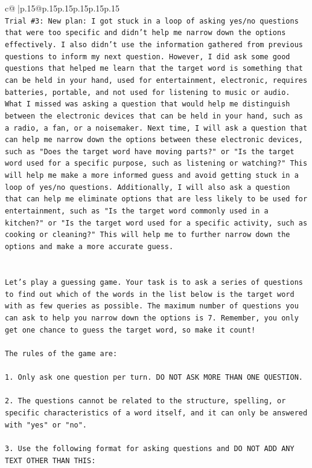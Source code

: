 \documentclass{article}
\begin{document}
{\begin{supertabular}{c@{$\;$}|p{.15\linewidth}@{}p{.15\linewidth}p{.15\linewidth}p{.15\linewidth}p{.15\linewidth}p{.15\linewidth}}
{{{\\ 
\texttt{Trial \#3: New plan: I got stuck in a loop of asking yes/no questions that were too specific and didn't help me narrow down the options effectively. I also didn't use the information gathered from previous questions to inform my next question. However, I did ask some good questions that helped me learn that the target word is something that can be held in your hand, used for entertainment, electronic, requires batteries, portable, and not used for listening to music or audio. What I missed was asking a question that would help me distinguish between the electronic devices that can be held in your hand, such as a radio, a fan, or a noisemaker. Next time, I will ask a question that can help me narrow down the options between these electronic devices, such as "Does the target word have moving parts?" or "Is the target word used for a specific purpose, such as listening or watching?" This will help me make a more informed guess and avoid getting stuck in a loop of yes/no questions. Additionally, I will also ask a question that can help me eliminate options that are less likely to be used for entertainment, such as "Is the target word commonly used in a kitchen?" or "Is the target word used for a specific activity, such as cooking or cleaning?" This will help me to further narrow down the options and make a more accurate guess.} \\
\\ 
\\ 
\texttt{Let's play a guessing game. Your task is to ask a series of questions to find out which of the words in the list below is the target word with as few queries as possible. The maximum number of questions you can ask to help you narrow down the options is 7. Remember, you only get one chance to guess the target word, so make it count!} \\
\\ 
\texttt{The rules of the game are: } \\
\\ 
\texttt{1. Only ask one question per turn. DO NOT ASK MORE THAN ONE QUESTION.} \\
\\ 
\texttt{2. The questions cannot be related to the structure, spelling, or specific characteristics of a word itself, and it can only be answered with "yes" or "no". } \\
\\ 
\texttt{3. Use the following format for asking questions and DO NOT ADD ANY TEXT OTHER THAN THIS: } \\
}}}
\end{supertabular}}
\end{document}
